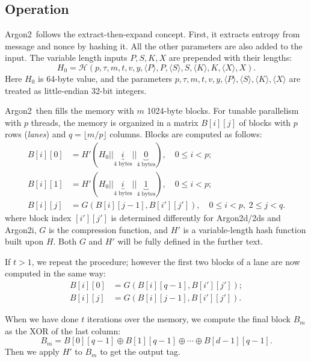 \documentclass[a4paper]{article}
\begin{document}
\subsection{Operation}

\textsf{Argon2}\ follows the extract-then-expand concept. First, it extracts entropy from message and nonce by hashing it.  All the other parameters are also added to the input. The variable length inputs $P,S,K,X$  are prepended with their lengths:
$$
H_0 = \mathcal{H}(p,\tau,m,t,v,y,\langle P \rangle,P,\langle S \rangle,S,\langle K \rangle,K, \langle X \rangle,X).
$$
Here $H_0$ is 64-byte value, and the parameters $p,\tau,m,t,v,y,
\langle P \rangle,\langle S \rangle, \langle K \rangle,\langle X \rangle$ are treated as little-endian 32-bit integers.

\textsf{Argon2}\ then fills the memory with $m$ 1024-byte blocks. For tunable parallelism with $p$ threads, the memory is organized in a matrix $B[i][j]$ of blocks
with $p$ rows (\emph{lanes}) and $q=\lfloor m/p \rfloor$ columns. Blocks are computed as follows:
\begin{align*}
B[i][0] &= H'(H_0||\underbrace{i}_{\text{4 bytes}}||\underbrace{0}_{\text{4 bytes}}),\quad 0 \leq i < p; \\
B[i][1] &= H'(H_0||\underbrace{i}_{\text{4 bytes}}||\underbrace{1}_{\text{4 bytes}}),\quad 0 \leq i < p;\\
B[i][j] &= G(B[i][j-1], B[i'][j']),\quad 0 \leq i < p,\; 2\leq j <q.
\end{align*}
where block index $[i'][j']$ is determined differently for \textsf{Argon2d/2ds} and \textsf{Argon2i},  $G$ is the compression function, and $H'$ is a variable-length hash function built upon $H$. Both $G$ and $H'$ will be fully defined in the further text. 

If $t>1$, we repeat the procedure; however the first two blocks of a lane are now computed in the same way:
\begin{align*}
B[i][0] &=G(B[i][q-1], B[i'][j']);\\
B[i][j] &= G(B[i][j-1], B[i'][j']).
\end{align*}

When we have done  $t$ iterations over the memory, we compute the final block $B_m$ as the XOR of the last column:
$$
B_m = B[0][q-1] \oplus B[1][q-1]\oplus \cdots\oplus B[d-1][q-1].
$$
Then we apply $H'$ to $B_m$ to get the output tag.
\end{document}
